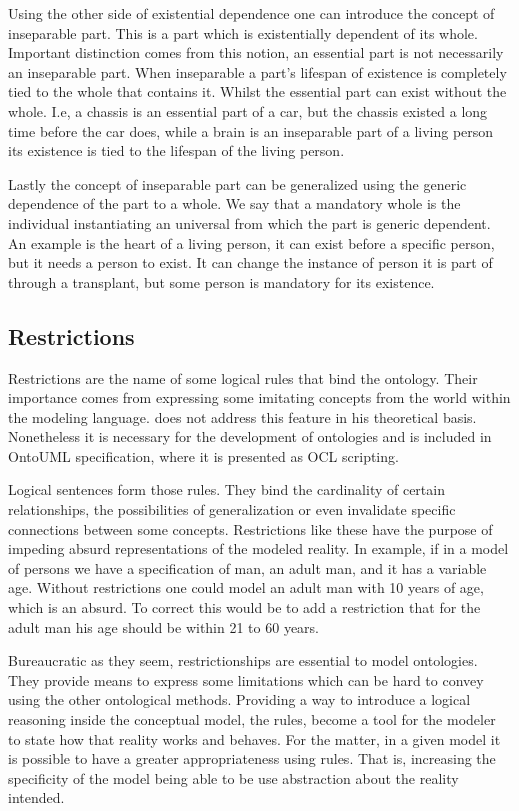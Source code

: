 Using the other side of existential dependence one can introduce the concept of inseparable part. This is a part which is existentially dependent of its whole. Important distinction comes from this notion, an essential part is not necessarily an inseparable part. When inseparable a part's lifespan of existence is completely tied to the whole that contains it. Whilst the essential part can exist without the whole. I.e, a chassis is an essential part of a car, but the chassis existed a long time before the car does, while a brain is an inseparable part of a living person its existence is tied to the lifespan of the living person.

Lastly the concept of inseparable part can be generalized using the generic dependence of the part to a whole. We say that a mandatory whole is the individual instantiating an universal from which the part is generic dependent. An example is the heart of a living person, it can exist before a specific person, but it needs a person to exist. It can change the instance of person it is part of through a transplant, but some person is mandatory for its existence.

\subsection{Restrictions}

Restrictions are the name of some logical rules that bind the ontology. Their importance comes from expressing some imitating concepts from the world within the modeling language.  \cite{guizzardi_ontological_2005} does not address this feature in his theoretical basis. Nonetheless it is necessary for the development of ontologies and is included in OntoUML specification, where it is presented as OCL scripting. \citep{guizzardi_ontoUML_2004}

Logical sentences form those rules. They bind the cardinality of certain relationships, the possibilities of generalization or even invalidate specific connections between some concepts. Restrictions like these have the purpose of impeding absurd representations of the modeled reality. In example, if in a model of persons we have a specification of man, an adult man, and it has a variable age. Without restrictions one could model an adult man with 10 years of age, which is an absurd. To correct this would be to add a restriction that for the adult man his age should be within 21 to 60 years.

Bureaucratic as they seem, restrictionships are essential to model ontologies. They provide means to express some limitations which can be hard to convey using the other ontological methods. Providing a way to introduce a logical reasoning inside the conceptual model, the rules, become a tool for the modeler to state how that reality works and behaves. For the matter, in a given model it is possible to have a greater appropriateness using rules. That is, increasing the specificity of the model being able to be use abstraction about the reality intended.